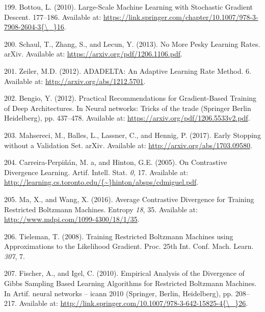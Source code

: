 \documentclass[11pt,a4paper,twoside]{book}
\theoremstyle{definition}
\theoremstyle{definition}
\theoremstyle{remark}
\begin{document}
\hypertarget{ref-Bottou2010}{}
199. Bottou, L. (2010). Large-Scale Machine Learning with Stochastic
Gradient Descent. 177--186. Available at:
\href{https://link.springer.com/chapter/10.1007/978-3-7908-2604-3\%7B/_\%7D16}{https://link.springer.com/chapter/10.1007/978-3-7908-2604-3\{\textbackslash{}\_\}16}.

\hypertarget{ref-Schaul2013}{}
200. Schaul, T., Zhang, S., and Lecun, Y. (2013). No More Pesky Learning
Rates. arXiv. Available at: \url{https://arxiv.org/pdf/1206.1106.pdf}.

\hypertarget{ref-Zeiler2012}{}
201. Zeiler, M.D. (2012). ADADELTA: An Adaptive Learning Rate Method. 6.
Available at: \url{http://arxiv.org/abs/1212.5701}.

\hypertarget{ref-Bengio2012}{}
202. Bengio, Y. (2012). Practical Recommendations for Gradient-Based
Training of Deep Architectures. In Neural networks: Tricks of the trade
(Springer Berlin Heidelberg), pp. 437--478. Available at:
\url{https://arxiv.org/pdf/1206.5533v2.pdf}.

\hypertarget{ref-Mahsereci2017}{}
203. Mahsereci, M., Balles, L., Lassner, C., and Hennig, P. (2017).
Early Stopping without a Validation Set. arXiv. Available at:
\url{http://arxiv.org/abs/1703.09580}.

\hypertarget{ref-Carreira-Perpinan2005}{}
204. Carreira-Perpiñán, M. a, and Hinton, G.E. (2005). On Contrastive
Divergence Learning. Artif. Intell. Stat. \emph{0}, 17. Available at:
\href{http://learning.cs.toronto.edu/\%7B~\%7Dhinton/absps/cdmiguel.pdf}{http://learning.cs.toronto.edu/\{\textasciitilde{}\}hinton/absps/cdmiguel.pdf}.

\hypertarget{ref-Ma2016}{}
205. Ma, X., and Wang, X. (2016). Average Contrastive Divergence for
Training Restricted Boltzmann Machines. Entropy \emph{18}, 35. Available
at: \url{http://www.mdpi.com/1099-4300/18/1/35}.

\hypertarget{ref-Tieleman2008}{}
206. Tieleman, T. (2008). Training Restricted Boltzmann Machines using
Approximations to the Likelihood Gradient. Proc. 25th Int. Conf. Mach.
Learn. \emph{307}, 7.

\hypertarget{ref-Fischer2010}{}
207. Fischer, A., and Igel, C. (2010). Empirical Analysis of the
Divergence of Gibbs Sampling Based Learning Algorithms for Restricted
Boltzmann Machines. In Artif. neural networks -- icann 2010 (Springer,
Berlin, Heidelberg), pp. 208--217. Available at:
\href{http://link.springer.com/10.1007/978-3-642-15825-4\%7B/_\%7D26}{http://link.springer.com/10.1007/978-3-642-15825-4\{\textbackslash{}\_\}26}.
\end{document}

